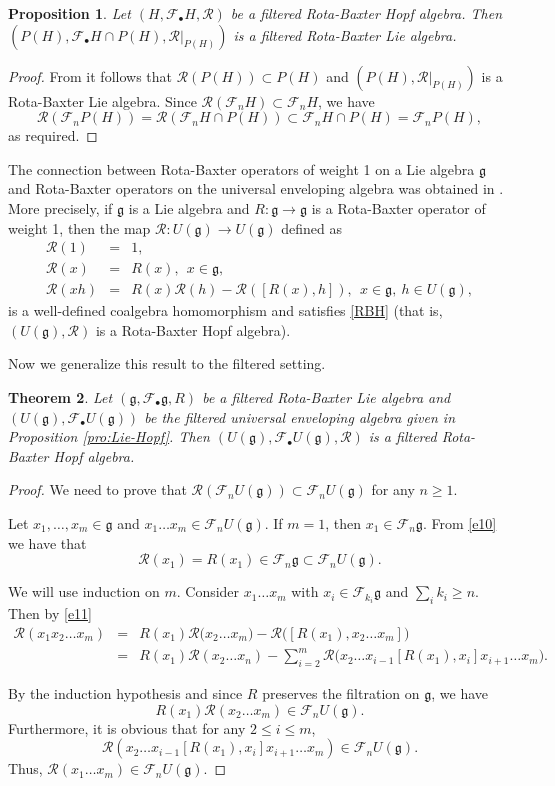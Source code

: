 \documentclass[12pt]{amsart}
\newtheorem{thm}{Theorem}[section]
\newtheorem{pro}[thm]{Proposition}
\theoremstyle{definition}   %
\newcommand{\g}{\mathfrak g}
\newcommand{\huaR}{\mathcal{R}}
\newcommand{\huaF}{\mathcal{F}}
\begin{document}
\begin{pro}
    Let $(H,\huaF_{\bullet} H,\huaR)$ be a filtered Rota-Baxter Hopf algebra. Then $(P(H), \huaF_{\bullet}H\cap P(H), \huaR|_{P(H)})$ is a filtered Rota-Baxter Lie algebra.
\end{pro}
\begin{proof}
   From \cite{Goncharov} it follows that $\huaR(P(H))\subset P(H)$ and $(P(H), \huaR|_{P(H)})$ is a Rota-Baxter Lie algebra.  Since $\huaR(\huaF_n H)\subset \huaF_n H$, we have $$\huaR(\huaF_n P(H))=\huaR(\huaF_n H\cap P(H))\subset \huaF_n H\cap P(H)=\huaF_n P(H),$$
   as required.
\end{proof}
The connection between Rota-Baxter operators of weight 1 on a Lie algebra $\g$ and Rota-Baxter operators on the universal enveloping algebra was obtained in \cite{Goncharov}. More precisely, if $\g$ is a Lie algebra and $R:\g\longrightarrow \g$ is a Rota-Baxter operator of weight 1, then the map $\huaR: U(\g)\longrightarrow U(\g)$ defined as
\begin{eqnarray}
    \huaR(1)&=&1 \label{e100},\\
    \huaR(x)&=&R(x),\ \ x\in \g, \label{e10}\\
    \huaR(xh)&=&R(x)\huaR(h)-\huaR([R(x),h]),\ \ x\in \g,
     \ h\in U(\g), \label{e11}
    \end{eqnarray}
is a well-defined coalgebra homomorphism and satisfies \eqref{RBH} (that is, $(U(\g),\huaR)$ is a Rota-Baxter Hopf algebra).

Now we generalize this result to the filtered setting.
\begin{thm}\label{thm:RBLie-RBH}
    Let $(\g, \huaF_{\bullet}\g, R)$ be a filtered Rota-Baxter Lie algebra and $(U(\g),\huaF_{\bullet}U(\g))$ be the filtered universal enveloping algebra given in Proposition \ref{pro:Lie-Hopf}. Then $(U(\g),\huaF_{\bullet}U(\g),\huaR)$ is a filtered Rota-Baxter Hopf algebra.
\end{thm}
\begin{proof}
 We need to prove that $\huaR( \huaF_nU(\g)) \subset \huaF_n U(\g)$ for any $n\geq 1$.

Let $x_1,\ldots,x_m\in \g$ and $x_1\ldots x_m\in \huaF_n U(\g)$. If $m=1$, then $x_1\in \huaF_n\g$.  From \eqref{e10} we have that $$\huaR(x_1)=R(x_1)\in \huaF_n \g\subset \huaF_n U(\g).$$

We will use induction on $m$. Consider $x_1\ldots x_m$ with $x_i\in \huaF_{k_i}\g$ and $\sum\limits_i k_i\geq n$. Then by \eqref{e11}
\begin{eqnarray*}
    \huaR(x_1 x_2\ldots x_m)&=&R(x_1)\huaR\big(x_2\ldots x_m)-\huaR([R(x_1),x_2\ldots x_m]\big)
    \\&=&R(x_1)\huaR(x_2\ldots x_n)-\sum\limits_{i=2}^m \huaR\big(x_2\ldots x_{i-1}[R(x_1),x_i]x_{i+1}\ldots x_m\big).
\end{eqnarray*}

By the induction hypothesis and since $R$ preserves the filtration on $\g$, we have $$R(x_1)\huaR(x_2\ldots x_m) \in \huaF_n U(\g).$$ Furthermore, it is obvious that for any $2 \leq i\leq m$, $$\huaR(x_2\ldots x_{i-1}[R(x_1),x_i]x_{i+1}\ldots x_m)\in \huaF_nU(\g).$$ Thus, $\huaR(x_1\ldots x_m)\in \huaF_n U(\mathfrak g)$.
\end{proof}
\end{document}
